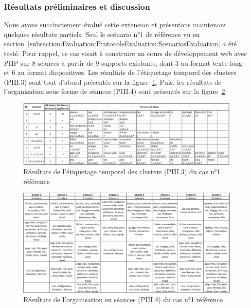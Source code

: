 \vfill
\hspace{0pt}

\newpage

\subsubsection{Résultats préliminaires et discussion}
\label{subsubsection:Conclusion:PerspectivesAmeliorations:AnalyseTemporelle:EvaluationDiscussion}

Nous avons succinctement évalué cette extension et présentons maintenant quelques résultats partiels.
Seul le scénario n°1 de référence vu en section~\ref{subsection:Evaluation:ProtocoleEvaluation:ScenariosEvaluation} a été testé.
Pour rappel, ce cas visait à construire un cours de développement web avec PHP sur 8 séances à partir de 9 supports existants, dont 3 au format texte long et 6 au format diapositives.
Les résultats de l'étiquetage temporel des clusters (PIII.3) sont tout d'abord présentés sur la figure~\ref{figure:5-Experience-EtiquetageClusters}.
Puis, les résultats de l'organisation sous forme de séances (PIII.4) sont présentés sur la figure~\ref{figure:5-Experience-SeancesOrganisees}.


\hspace{0pt}
\vfill


\begin{figure}[ht!]
\centering
\centerline{  %
\includegraphics[scale=0.6]{5-Conclusion/images/exemples/clusters-S=H-B=1.00-votants.png}
}
\caption{Résultats de l'étiquetage temporel des clusters (PIII.3) du cas n°1 référence}
\label{figure:5-Experience-EtiquetageClusters}
\end{figure}



\begin{figure}[ht!]
\centering
\centerline{  %
\includegraphics[scale=0.6]{5-Conclusion/images/exemples/scenario-S=H-B=1.00.png}
}
\caption{Résultats de l'organisation en séances (PIII.4) du cas n°1 référence}
\label{figure:5-Experience-SeancesOrganisees}
\end{figure}


